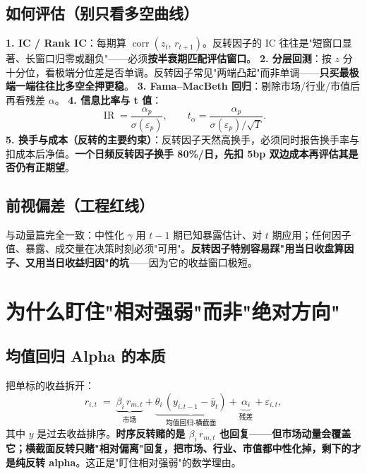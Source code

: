 \documentclass[UTF8,11pt]{ctexart}
\begin{document}
\subsection{如何评估（别只看多空曲线）}
\textbf{1. IC / Rank IC}：每期算 $\operatorname{corr}(z_t,\,r_{t+1})$。反转因子的 IC 往往是"短窗口显著、长窗口归零或翻负"——必须\textbf{按半衰期匹配评估窗口}。
\textbf{2. 分层回测}：按 $z$ 分十分位，看极端分位差是否单调。反转因子常见"两端凸起"而非单调——\textbf{只买最极端一端往往比多空全押更稳}。
\textbf{3. Fama--MacBeth 回归}：剔除市场/行业/市值后再看残差 $\alpha$。
\textbf{4. 信息比率与 t 值}：
\begin{equation}
\operatorname{IR}=\frac{\alpha_p}{\sigma(\varepsilon_p)},\qquad
t_\alpha=\frac{\alpha_p}{\sigma(\varepsilon_p)/\sqrt{T}}.
\end{equation}
\textbf{5. 换手与成本（反转的主要约束）}：反转因子天然高换手，必须同时报告换手率与扣成本后净值。\textbf{一个日频反转因子换手 80\%/日，先扣 5bp 双边成本再评估其是否仍有正期望}。

\subsection{前视偏差（工程红线）}
与动量篇完全一致：中性化 $\gamma$ 用 $t-1$ 期已知暴露估计、对 $t$ 期应用；任何因子值、暴露、成交量在决策时刻必须"可用"。\textbf{反转因子特别容易踩"用当日收盘算因子、又用当日收益归因"的坑}——因为它的收益窗口极短。

\section{为什么盯住"相对强弱"而非"绝对方向"}

\subsection{均值回归 Alpha 的本质}
把单标的收益拆开：
\begin{equation}
r_{i,t} \;=\; \underbrace{\beta_i\,r_{m,t}}_{\text{市场}} + \underbrace{\theta_i\,(y_{i,t-1} - \bar y_t)}_{\text{均值回归·横截面}} + \underbrace{\alpha_i}_{\text{残差}} + \varepsilon_{i,t},
\end{equation}
其中 $y$ 是过去收益排序。\textbf{时序反转赌的是 $\beta_i\,r_{m,t}$ 也回复——但市场动量会覆盖它；横截面反转只赌"相对偏离"回复，把市场、行业、市值都中性化掉，剩下的才是纯反转 alpha}。这正是"盯住相对强弱"的数学理由。
\end{document}
